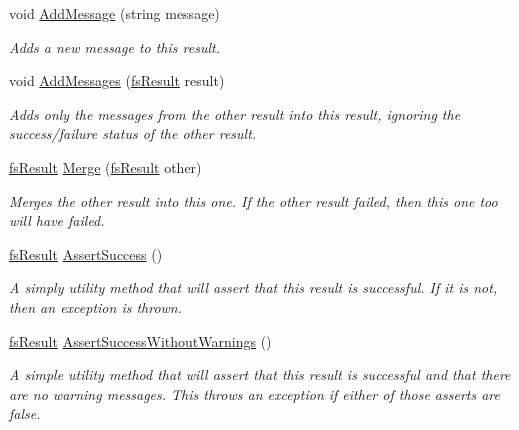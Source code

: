 \begin{DoxyCompactItemize}
\item 
void \hyperlink{struct_full_serializer_1_1fs_result_afe5ac00b5b1c6b4863a4a7870cbbd066}{Add\+Message} (string message)
\begin{DoxyCompactList}\small\item\em Adds a new message to this result. \end{DoxyCompactList}\item 
void \hyperlink{struct_full_serializer_1_1fs_result_a7aff2b2f78db0d8e0b9e0daeb08a8f70}{Add\+Messages} (\hyperlink{struct_full_serializer_1_1fs_result}{fs\+Result} result)
\begin{DoxyCompactList}\small\item\em Adds only the messages from the other result into this result, ignoring the success/failure status of the other result. \end{DoxyCompactList}\item 
\hyperlink{struct_full_serializer_1_1fs_result}{fs\+Result} \hyperlink{struct_full_serializer_1_1fs_result_abb53580c70996e49251eb1fd4bc62f4b}{Merge} (\hyperlink{struct_full_serializer_1_1fs_result}{fs\+Result} other)
\begin{DoxyCompactList}\small\item\em Merges the other result into this one. If the other result failed, then this one too will have failed. \end{DoxyCompactList}\item 
\hyperlink{struct_full_serializer_1_1fs_result}{fs\+Result} \hyperlink{struct_full_serializer_1_1fs_result_a2f5ddbcfe4d51a087e1870df76cc2235}{Assert\+Success} ()
\begin{DoxyCompactList}\small\item\em A simply utility method that will assert that this result is successful. If it is not, then an exception is thrown. \end{DoxyCompactList}\item 
\hyperlink{struct_full_serializer_1_1fs_result}{fs\+Result} \hyperlink{struct_full_serializer_1_1fs_result_a0779492de62a8b952b37617c2e7ff362}{Assert\+Success\+Without\+Warnings} ()
\begin{DoxyCompactList}\small\item\em A simple utility method that will assert that this result is successful and that there are no warning messages. This throws an exception if either of those asserts are false. \end{DoxyCompactList}\end{DoxyCompactItemize}

